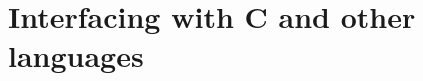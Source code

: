 \chapter{Interfacing with C and other languages}
\label{app:chap:Interfacing with C and other languages}
